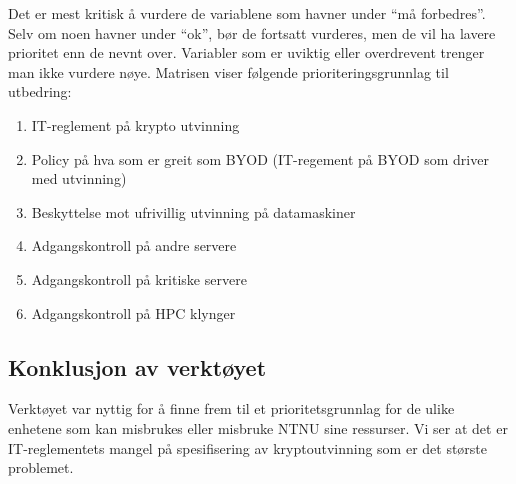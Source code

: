 Det er mest kritisk å vurdere de variablene som havner under ``må forbedres''. Selv om noen havner under ``ok'', bør de fortsatt vurderes, men de vil ha lavere prioritet enn de nevnt over. Variabler som er uviktig eller overdrevent trenger man ikke vurdere nøye. Matrisen viser følgende prioriteringsgrunnlag til utbedring:

\begin{enumerate}
    \item IT-reglement på krypto utvinning
    \item Policy på hva som er greit som BYOD (IT-regement på BYOD som driver med utvinning)
    \item Beskyttelse mot ufrivillig utvinning på datamaskiner
    \item Adgangskontroll på andre servere
    \item Adgangskontroll på kritiske servere
    \item Adgangskontroll på HPC klynger
\end{enumerate}

\subsection{Konklusjon av verktøyet}
Verktøyet var nyttig for å finne frem til et prioritetsgrunnlag for de ulike enhetene som kan misbrukes eller misbruke NTNU sine ressurser. Vi ser at det er IT-reglementets mangel på spesifisering av kryptoutvinning som er det største problemet. 